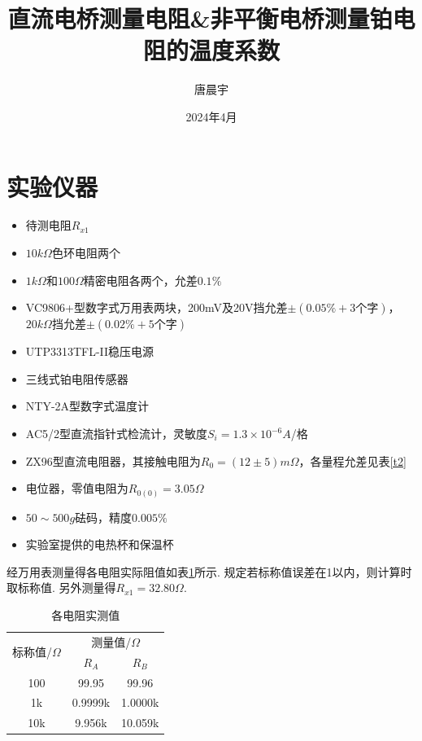 \documentclass[12pt, a4paper]{ctexart}
\begin{document}
\title{直流电桥测量电阻\&非平衡电桥测量铂电阻的温度系数}
\author{唐晨宇 }
\date{2024年4月}

\maketitle
{}

\tableofcontents

\clearpage

\section*{实验仪器}

\begin{itemize}
    \item 待测电阻$R_{x1}$
    \item $10k\Omega$色环电阻两个
    \item $1k\Omega$和$100\Omega$精密电阻各两个，允差$0.1\%$
    \item VC9806+型数字式万用表两块，200mV及20V挡允差$\pm (0.05\% + 3 \text{个字})$，$20k\Omega$挡允差$\pm (0.02\% + 5\text{个字})$
    \item UTP3313TFL-II稳压电源
    \item 三线式铂电阻传感器
    \item NTY-2A型数字式温度计
    \item AC5/2型直流指针式检流计，灵敏度$S_i= 1.3 \times 10^{-6} A$/格
    \item ZX96型直流电阻器，其接触电阻为$R_0 = (12 \pm 5)m\Omega$，各量程允差见表\ref{t2}
    \item 电位器，零值电阻为$R_{0(0)} = 3.05\Omega$
    \item $50\sim 500g$砝码，精度$0.005\%$
    \item 实验室提供的电热杯和保温杯
\end{itemize}

经万用表测量得各电阻实际阻值如表\ref{t1}所示.
规定若标称值误差在1\textperthousand 以内，则计算时取标称值.
另外测量得$R_{x1} = 32.80\Omega$.

\begin{table}[hbtp]
    \centering
    \begin{tabular}{|c|c|c|}
    \hline
    \multirow{2}{*}{标称值/$\Omega$} & \multicolumn{2}{c|}{测量值/$\Omega$} \\
    \cline{2-3}
      & $R_A$ & $R_B$ \\
    \hline
    100 & 99.95 &99.96 \\
    \hline
    1k & 0.9999k & 1.0000k \\
    \hline
    10k & 9.956k &10.059k \\
    \hline
    \end{tabular}
    \caption{各电阻实测值}
    \label{t1}
\end{table}
\end{document}
